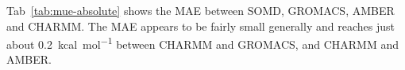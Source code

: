 \documentclass[journal=jctcce,manuscript=article]{achemso}
\begin{document}
Tab~\ref{tab:mue-absolute} shows the MAE between SOMD, GROMACS, AMBER and 
CHARMM.
The MAE appears to be fairly small generally and reaches just about 
\SI{0.2}{kcal.mol^{-1}} between CHARMM and GROMACS, and CHARMM and AMBER.
\begin{table}[]
  \begin{minipage}{\linewidth}
    \caption{MAE (\SI{}{kcal.mol^{-1}}) comparing relative free energies from 
      absolute simulations between SOMD, GROMACS, AMBER and 
      CHARMM.}\label{tab:mue-absolute}
  \end{minipage}
\end{table}
\end{document}
